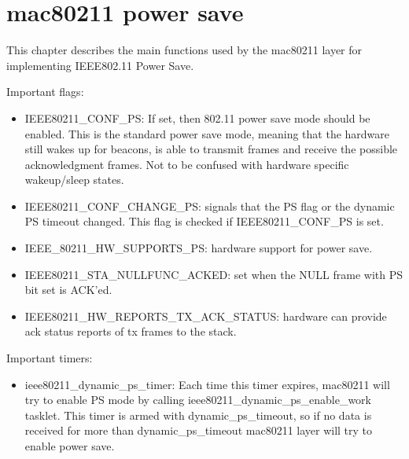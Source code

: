 \section{mac80211 power save}
\label{sec:mac80211}
This chapter describes the main functions used by the mac80211 layer for implementing IEEE802.11 Power Save.

Important flags:
\begin{itemize}
\item IEEE80211_CONF_PS: If set, then 802.11 power save mode should be enabled. This is the standard power save mode, meaning that the hardware still wakes up for beacons, is able to transmit frames and receive the possible acknowledgment frames. Not to be confused with hardware specific wakeup/sleep states.
\item IEEE80211_CONF_CHANGE_PS: signals that the PS flag or the dynamic PS timeout changed. This flag is checked if IEEE80211_CONF_PS is set.
\item IEEE_80211_HW_SUPPORTS_PS: hardware support for power save.
\item IEEE80211_STA_NULLFUNC_ACKED: set when the NULL frame with PS bit set is ACK'ed.
\item IEEE80211_HW_REPORTS_TX_ACK_STATUS: hardware can provide ack status reports of tx frames to the stack.
\end{itemize}

Important timers:
\begin{itemize}
\item ieee80211_dynamic_ps_timer: Each time this timer expires, mac80211 will try to enable PS mode by calling ieee80211_dynamic_ps_enable_work tasklet. This timer is armed with dynamic_ps_timeout, so if no data is received for more than dynamic_ps_timeout mac80211 layer will try to enable power save.
\end{itemize}

